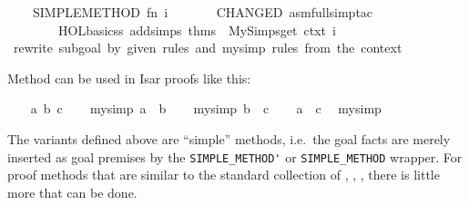 \begin{isabellebody}
\ \ \ \ SIMPLE{\isacharunderscore}METHOD{\isacharprime}\ {\isacharparenleft}fn\ i\ {\isacharequal}{\isachargreater}\isanewline
\ \ \ \ \ \ CHANGED\ {\isacharparenleft}asm{\isacharunderscore}full{\isacharunderscore}simp{\isacharunderscore}tac\isanewline
\ \ \ \ \ \ \ \ {\isacharparenleft}HOL{\isacharunderscore}basic{\isacharunderscore}ss\ addsimps\ {\isacharparenleft}thms\ {\isacharat}\ My{\isacharunderscore}Simps{\isachardot}get\ ctxt{\isacharparenright}{\isacharparenright}\ i{\isacharparenright}{\isacharparenright}{\isacharparenright}\isanewline
{\isacharverbatimclose}\ {\isachardoublequoteopen}rewrite\ subgoal\ by\ given\ rules\ and\ my{\isacharunderscore}simp\ rules\ from\ the\ context{\isachardoublequoteclose}%
\endisatagML
{\isafoldML}%
%
\isadelimML
%
\endisadelimML
%
\begin{isamarkuptext}%
\medskip Method \hyperlink{method.my-simp'}{\mbox{}} can be used in Isar proofs
  like this:%
\end{isamarkuptext}%
\isamarkuptrue%
\isamarkupfalse%
\isanewline
%
\isadelimproof
\ \ %
\endisadelimproof
%
\isatagproof
{}\isamarkupfalse%
\ a\ b\ c\isanewline
\ \ \isamarkupfalse%
\ {\isacharbrackleft}my{\isacharunderscore}simp{\isacharbrackright}{\isacharcolon}\ {\isachardoublequoteopen}a\ {\isasymequiv}\ b{\isachardoublequoteclose}\isanewline
\ \ \isamarkupfalse%
\ {\isacharbrackleft}my{\isacharunderscore}simp{\isacharbrackright}{\isacharcolon}\ {\isachardoublequoteopen}b\ {\isasymequiv}\ c{\isachardoublequoteclose}\isanewline
\ \ \isamarkupfalse%
\ {\isachardoublequoteopen}a\ {\isasymequiv}\ c{\isachardoublequoteclose}\ \isamarkupfalse%
\ my{\isacharunderscore}simp{\isacharprime}\isanewline
{}\isamarkupfalse%
%
\endisatagproof
{\isafoldproof}%
%
\isadelimproof
%
\endisadelimproof
%
\begin{isamarkuptext}%
\medskip The \hyperlink{method.my-simp}{\mbox{}} variants defined above are
  ``simple'' methods, i.e.\ the goal facts are merely inserted as goal
  premises by the \verb|SIMPLE_METHOD'| or \verb|SIMPLE_METHOD| wrapper.
  For proof methods that are similar to the standard collection of
  \hyperlink{method.simp}{\mbox{}}, \hyperlink{method.blast}{\mbox{}}, \hyperlink{method.fast}{\mbox{}}, \hyperlink{method.auto}{\mbox{}}
  there is little more that can be done.


\end{isamarkuptext}
\end{isabellebody}
